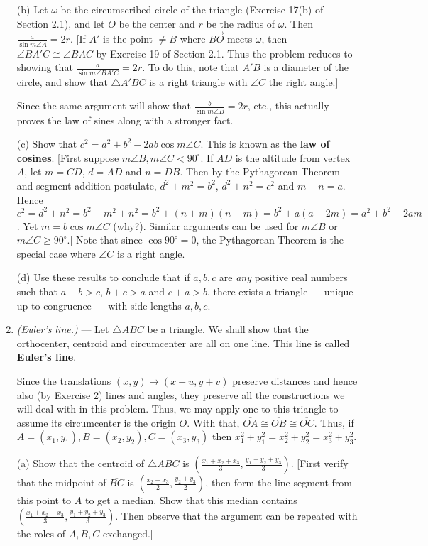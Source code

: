 \documentclass[leqno]{book}
\begin{document}
\begin{enumerate}
(b) Let $\omega$ be the circumscribed circle of the triangle (Exercise 17(b) of Section 2.1), and let $O$ be the center and $r$ be the radius of $\omega$.  Then $\frac a{\sin m\angle A}=2r$.  [If $A'$ is the point $\ne B$ where $\overset{\longrightarrow}{BO}$ meets $\omega$, then $\angle BA'C\cong\angle BAC$ by Exercise 19 of Section 2.1.  Thus the problem reduces to showing that $\frac a{\sin m\angle BA'C}=2r$.  To do this, note that $\overline{A'B}$ is a diameter of the circle, and show that $\triangle A'BC$ is a right triangle with $\angle C$ the right angle.]

Since the same argument will show that $\frac b{\sin m\angle B}=2r$, etc., this actually proves the law of sines along with a stronger fact.

(c) Show that $c^2=a^2+b^2-2ab\cos m\angle C$.  This is known as the \textbf{law of cosines}.  [First suppose $m\angle B,m\angle C<90^\circ$.  If $\overline{AD}$ is the altitude from vertex $A$, let $m=CD$, $d=AD$ and $n=DB$.  Then by the Pythagorean Theorem and segment addition postulate, $d^2+m^2=b^2$, $d^2+n^2=c^2$ and $m+n=a$.  Hence $c^2=d^2+n^2=b^2-m^2+n^2=b^2+(n+m)(n-m)=b^2+a(a-2m)=a^2+b^2-2am$.  Yet $m=b\cos m\angle C$ (why?).  Similar arguments can be used for $m\angle B$ or $m\angle C\geqslant 90^\circ$.]  Note that since $\cos 90^\circ=0$, the Pythagorean Theorem is the special case where $\angle C$ is a right angle.

(d) Use these results to conclude that if $a,b,c$ are \emph{any} positive real numbers such that $a+b>c$, $b+c>a$ and $c+a>b$, there exists a triangle \---- unique up to congruence \---- with side lengths $a,b,c$.

\item\emph{(Euler's line.)} \---- Let $\triangle ABC$ be a triangle.  We shall show that the orthocenter, centroid and circumcenter are all on one line.  This line is called \textbf{Euler's line}.

Since the translations $(x,y)\mapsto(x+u,y+v)$ preserve distances and hence also (by Exercise 2) lines and angles, they preserve all the constructions we will deal with in this problem.  Thus, we may apply one to this triangle to assume its circumcenter is the origin $O$.  With that, $\overline{OA}\cong\overline{OB}\cong\overline{OC}$.  Thus, if $A=(x_1,y_1),B=(x_2,y_2),C=(x_3,y_3)$ then $x_1^2+y_1^2=x_2^2+y_2^2=x_3^2+y_3^2$.

(a) Show that the centroid of $\triangle ABC$ is $\left(\frac{x_1+x_2+x_3}3,\frac{y_1+y_2+y_3}3\right)$.  [First verify that the midpoint of $\overline{BC}$ is $\left(\frac{x_2+x_3}2,\frac{y_2+y_3}2\right)$, then form the line segment from this point to $A$ to get a median.  Show that this median contains $\left(\frac{x_1+x_2+x_3}3,\frac{y_1+y_2+y_3}3\right)$.  Then observe that the argument can be repeated with the roles of $A,B,C$ exchanged.]


\end{enumerate}
\end{document}
